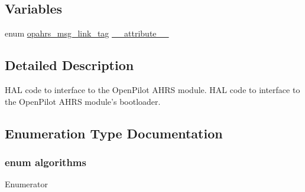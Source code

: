 \subsection*{Variables}
\begin{DoxyCompactItemize}
\item 
enum \hyperlink{group___p_i_o_s___o_p_a_h_r_s_ga8973c96ae9d6e7d40e63cb2bf0a78a79}{opahrs\-\_\-msg\-\_\-link\-\_\-tag} \hyperlink{group___p_i_o_s___o_p_a_h_r_s_gae3a4c771a553ac3c82d202447329815e}{\-\_\-\-\_\-attribute\-\_\-\-\_\-}
\end{DoxyCompactItemize}


\subsection{Detailed Description}
H\-A\-L code to interface to the Open\-Pilot A\-H\-R\-S module. H\-A\-L code to interface to the Open\-Pilot A\-H\-R\-S module's bootloader.

\subsection{Enumeration Type Documentation}
\hypertarget{group___p_i_o_s___o_p_a_h_r_s_gad28a1b6c64625a10e04b25f75d2e7b51}{
\subsubsection[{algorithms}]{\setlength{\rightskip}{0pt plus 5cm}enum {\bf algorithms}}}\label{group___p_i_o_s___o_p_a_h_r_s_gad28a1b6c64625a10e04b25f75d2e7b51}
\begin{Desc}
\item[Enumerator]\par
\begin{description}
\item[{\em 
\hypertarget{group___p_i_o_s___o_p_a_h_r_s_ggad28a1b6c64625a10e04b25f75d2e7b51abf184293a3911cd745a5eff692d5467e}{S\-I\-M\-P\-L\-E\-\_\-\-Algo}\label{group___p_i_o_s___o_p_a_h_r_s_ggad28a1b6c64625a10e04b25f75d2e7b51abf184293a3911cd745a5eff692d5467e}
}]\item[{\em 
\hypertarget{group___p_i_o_s___o_p_a_h_r_s_ggad28a1b6c64625a10e04b25f75d2e7b51a31b24ca865a5e959b768ca8906fbb07b}{I\-N\-S\-G\-P\-S\-\_\-\-Algo}\label{group___p_i_o_s___o_p_a_h_r_s_ggad28a1b6c64625a10e04b25f75d2e7b51a31b24ca865a5e959b768ca8906fbb07b}
}]\end{description}
\end{Desc}


